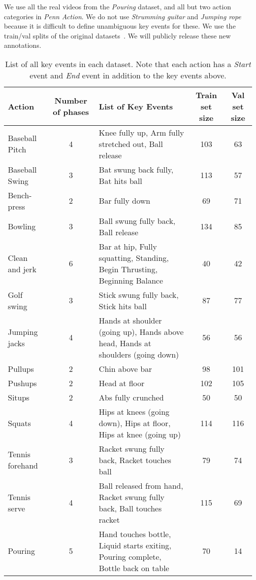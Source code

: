 \documentclass[10pt,twocolumn,letterpaper]{article}
\begin{document}
We use all the real videos from the \textit{Pouring}  dataset, and all but two action categories
in \textit{Penn Action}. We do not use
\textit{Strumming guitar} and \textit{Jumping rope} because
it is difficult to define unambiguous key events for these. We 
use the train/val splits of the original
datasets~\cite{Sermanet2017TCN,zhang2013actemes}. 
We will publicly release these new annotations.

\begin{table*}[!h]
\setlength{\tabcolsep}{0.3em}
\centering
\footnotesize{
    \begin{tabular}{l|c|l|c| c}
        \textbf{Action} & \textbf{Number of phases} & \textbf{List of Key Events} & \textbf{Train set size} & \textbf{Val set size} \\
        \midrule
        \midrule
        Baseball Pitch & 4 & Knee fully up, Arm fully stretched out, Ball release & 103 & 63\\
        Baseball Swing & 3 & Bat swung back fully, Bat hits ball & 113 & 57\\
        Bench-press & 2 & Bar fully down & 69 & 71\\
        Bowling & 3 & Ball swung fully back, Ball release & 134 & 85\\
        Clean and jerk & 6 & Bar at hip, Fully squatting, Standing, Begin Thrusting, Beginning Balance & 40 & 42\\
        Golf swing & 3 & Stick swung fully back, Stick hits ball & 87 & 77 \\
        Jumping jacks & 4 & Hands at shoulder (going up), Hands above head, Hands at shoulders (going down) & 56 & 56\\
        Pullups & 2 & Chin above bar & 98 & 101\\
        Pushups & 2 & Head at floor & 102 & 105\\
        Situps & 2 & Abs fully crunched & 50 & 50\\
        Squats & 4 & Hips at knees (going down), Hips at floor, Hips at knee (going up) &  114 & 116\\
        Tennis forehand & 3 & Racket swung fully back, Racket touches ball & 79 & 74\\
        Tennis serve & 4 & Ball released from hand, Racket swung fully back, Ball touches racket &  115 & 69\\
        Pouring & 5 & Hand touches bottle, Liquid starts exiting, Pouring complete, Bottle back on table & 70 & 14\\
        \bottomrule
 
    \end{tabular}
\caption{List of all key events in each dataset. Note that each action has a \textit{Start} event and \textit{End} event in addition to the key events above.}\label{tab:dataset}
}
\vspace{-1em}
\end{table*}
\end{document}
